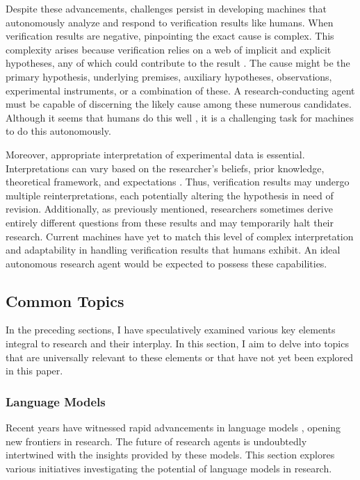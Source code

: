 \documentclass{article}
\begin{document}
Despite these advancements, challenges persist in developing machines that autonomously analyze and respond to verification results like humans. When verification results are negative, pinpointing the exact cause is complex. This complexity arises because verification relies on a web of implicit and explicit hypotheses, any of which could contribute to the result \cite{sep-scientific-underdetermination}. The cause might be the primary hypothesis, underlying premises, auxiliary hypotheses, observations, experimental instruments, or a combination of these. A research-conducting agent must be capable of discerning the likely cause among these numerous candidates. Although it seems that humans do this well \cite{ren2023autonomous}, it is a challenging task for machines to do this autonomously.

Moreover, appropriate interpretation of experimental data is essential. Interpretations can vary based on the researcher's beliefs, prior knowledge, theoretical framework, and expectations \cite{hanson1965patterns}. Thus, verification results may undergo multiple reinterpretations, each potentially altering the hypothesis in need of revision. Additionally, as previously mentioned, researchers sometimes derive entirely different questions from these results and may temporarily halt their research. Current machines have yet to match this level of complex interpretation and adaptability in handling verification results that humans exhibit. An ideal autonomous research agent would be expected to possess these capabilities.

\subsection{Common Topics}
In the preceding sections, I have speculatively examined various key elements integral to research and their interplay. In this section, I aim to delve into topics that are universally relevant to these elements or that have not yet been explored in this paper. 

\subsubsection{Language Models}
Recent years have witnessed rapid advancements in language models \cite{zhao2023survey}, opening new frontiers in research. The future of research agents is undoubtedly intertwined with the insights provided by these models. This section explores various initiatives investigating the potential of language models in research.
\end{document}
